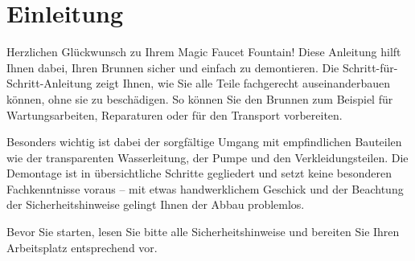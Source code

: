 %
%

\chapter{Einleitung}
Herzlichen Glückwunsch zu Ihrem Magic Faucet Fountain! Diese Anleitung hilft Ihnen dabei, Ihren Brunnen sicher und einfach zu demontieren. Die Schritt-für-Schritt-Anleitung zeigt Ihnen, wie Sie alle Teile fachgerecht auseinanderbauen können, ohne sie zu beschädigen. So können Sie den Brunnen zum Beispiel für Wartungsarbeiten, Reparaturen oder für den Transport vorbereiten.

Besonders wichtig ist dabei der sorgfältige Umgang mit empfindlichen Bauteilen wie der transparenten Wasserleitung, der Pumpe und den Verkleidungsteilen. Die Demontage ist in übersichtliche Schritte gegliedert und setzt keine besonderen Fachkenntnisse voraus – mit etwas handwerklichem Geschick und der Beachtung der Sicherheitshinweise gelingt Ihnen der Abbau problemlos.

Bevor Sie starten, lesen Sie bitte alle Sicherheitshinweise und bereiten Sie Ihren Arbeitsplatz entsprechend vor.



